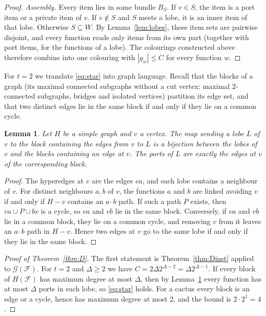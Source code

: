 \documentclass[11pt,letterpaper]{article}
\newtheorem{lemma}[theorem]{Lemma}
\theoremstyle{definition}
\newcommand{\cF}{\mathcal{F}}
\newcommand{\cG}{\mathcal{G}}
\begin{document}
\begin{proof}
\smallskip\noindent\emph{Assembly.} Every item lies in some bundle $B_S$. If $v\in S$, the item is a
port item or a private item of $v$. If $v\notin S$ and $S$ meets a lobe, it is an inner item of
that lobe. Otherwise $S\subseteq W$. By Lemma~\ref{lem:lobes}, these item sets are pairwise
disjoint, and every function reads only items from its own part (together with port items, for the
functions of a lobe). The colourings constructed above therefore combine into one colouring with
$|g_w|\le C$ for every function $w$.
\end{proof}

For $t=2$ we translate \eqref{eq:star} into graph language. Recall that the blocks of a graph (its
maximal connected subgraphs without a cut vertex: maximal $2$-connected subgraphs, bridges and
isolated vertices) partition its edge set, and that two distinct edges lie in the same block if and
only if they lie on a common cycle.

\begin{lemma}\label{lem:blocks}
Let $H$ be a simple graph and $v$ a vertex. The map sending a lobe $L$ of $v$ to the block
containing the edges from $v$ to $L$ is a bijection between the lobes of $v$ and the blocks
containing an edge at $v$. The ports of $L$ are exactly the edges at $v$ of the corresponding block.
\end{lemma}

\begin{proof}
The hyperedges at $v$ are the edges $va$, and each lobe contains a neighbour of $v$. For distinct
neighbours $a,b$ of $v$, the functions $a$ and $b$ are linked avoiding $v$ if and only if $H-v$
contains an $a$--$b$ path. If such a path $P$ exists, then $va\cup P\cup bv$ is a cycle, so $va$
and $vb$ lie in the same block. Conversely, if $va$ and $vb$ lie in a common block, they lie on a
common cycle, and removing $v$ from it leaves an $a$--$b$ path in $H-v$. Hence two edges at $v$ go
to the same lobe if and only if they lie in the same block.
\end{proof}

\begin{proof}[Proof of Theorem~\ref{thm:D}]
The first statement is Theorem~\ref{thm:Dinst} applied to $\cG(\cF)$. For $t=2$ and $\Delta\ge2$
we have $C=2\Delta2^{\Delta-2}=\Delta2^{\Delta-1}$. If every block of $H(\cF)$ has maximum degree at
most $\Delta$, then by Lemma~\ref{lem:blocks} every function has at most $\Delta$ ports in each
lobe, so \eqref{eq:star} holds. For a cactus every block is an edge or a cycle, hence has maximum
degree at most $2$, and the bound is $2\cdot2^{1}=4$.
\end{proof}
\end{document}
